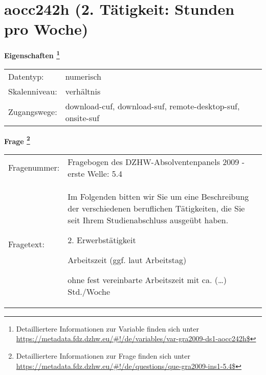
    \setcounter{footnote}{0}

    \vspace*{-1.8cm}
	\section{aocc242h (2. Tätigkeit: Stunden pro Woche)}
	\label{section:aocc242h}



    \vspace*{0.5cm}
    \noindent\textbf{Eigenschaften
	\footnote{Detailliertere Informationen zur Variable finden sich unter
		\url{https://metadata.fdz.dzhw.eu/\#!/de/variables/var-gra2009-ds1-aocc242h$}}}\\
	\begin{tabularx}{\hsize}{@{}lX}
	Datentyp: & numerisch \\
	Skalenniveau: & verhältnis \\
	Zugangswege: &
	  download-cuf, 
	  download-suf, 
	  remote-desktop-suf, 
	  onsite-suf
 \\
    \end{tabularx}



				\vspace*{0.5cm}
                \noindent\textbf{Frage
	                \footnote{Detailliertere Informationen zur Frage finden sich unter
		              \url{https://metadata.fdz.dzhw.eu/\#!/de/questions/que-gra2009-ins1-5.4$}}}\\
				\begin{tabularx}{\hsize}{@{}lX}
					Fragenummer: &
					  Fragebogen des DZHW-Absolventenpanels 2009 - erste Welle:
					  5.4
 \\
					Fragetext: & Im Folgenden bitten wir Sie um eine Beschreibung der verschiedenen beruflichen Tätigkeiten, die Sie seit Ihrem Studienabschluss ausgeübt haben.\par  2. Erwerbstätigkeit\par  Arbeitszeit (ggf. laut Arbeitstag)\par  ohne fest vereinbarte Arbeitszeit mit ca. (…) Std./Woche \\
				\end{tabularx}






